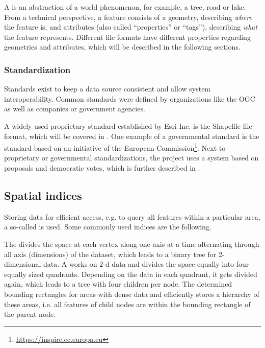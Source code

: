 			A  is an abstraction of a world phenomenon, for example, a tree, road or lake.
			From a technical perspective, a feature consists of a geometry, describing \textit{where} the feature is, and attributes (also called \enquote{properties} or \enquote{tags}), describing \textit{what} the feature represents.
			Different file formats have different properties regarding geometries and attributes, which will be described in the following sections.
		
		\subsubsection{Standardization}
		
			Standards exist to keep a data source consistent and allow system interoperability.
			Common standards were defined by organizations like the OGC as well as companies or government agencies.
			
			A widely used proprietary standard established by Esri Inc. is the Shapefile file format, which will be covered in .
			One example of a governmental standard is the  standard based on an initiative of the European Commission\footnote{\url{https://inspire.ec.europa.eu}}.
			Next to proprietary or governmental standardizations, the  project uses a system based on proposals and democratic votes, which is further described in .
			
		\subsection{Spatial indices}
		
			Storing data for efficient access, e.g. to query all features within a particular area, a so-called  is used.
			Some commonly used indices are the following.
			
			The \cite[Ch.\ 19,p. 4]{mehta-handbook-data-structures} divides the space at each vertex along one axis at a time alternating through all axis (dimensions) of the dataset, which leads to a binary tree for 2-dimensional data.
			A \cite[Ch.\ 19,p. 1]{mehta-handbook-data-structures} works on 2-d data and divides the space equally into four equally sized quadrants.
			Depending on the data in each quadrant, it gets divided again, which leads to a tree with four children per node.
			The \cite[Ch.\ 21,p. 2]{mehta-handbook-data-structures} determined bounding rectangles for areas with dense data and efficiently stores a hierarchy of these areas, i.e. all features of child nodes are within the bounding rectangle of the parent node.
			
